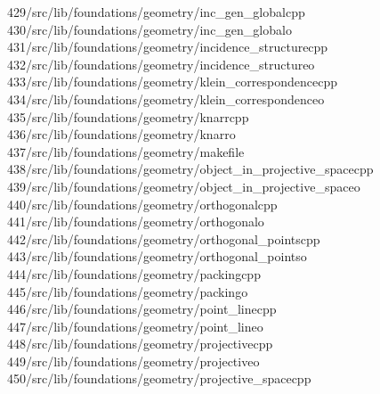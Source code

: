 \begin{tabbing}
429\>/src/lib/foundations/geometry/inc\_gen\_globalcpp\\[0pt]
430\>/src/lib/foundations/geometry/inc\_gen\_globalo\\[0pt]
431\>/src/lib/foundations/geometry/incidence\_structurecpp\\[0pt]
432\>/src/lib/foundations/geometry/incidence\_structureo\\[0pt]
433\>/src/lib/foundations/geometry/klein\_correspondencecpp\\[0pt]
434\>/src/lib/foundations/geometry/klein\_correspondenceo\\[0pt]
435\>/src/lib/foundations/geometry/knarrcpp\\[0pt]
436\>/src/lib/foundations/geometry/knarro\\[0pt]
437\>/src/lib/foundations/geometry/makefile\\[0pt]
438\>/src/lib/foundations/geometry/object\_in\_projective\_spacecpp\\[0pt]
439\>/src/lib/foundations/geometry/object\_in\_projective\_spaceo\\[0pt]
440\>/src/lib/foundations/geometry/orthogonalcpp\\[0pt]
441\>/src/lib/foundations/geometry/orthogonalo\\[0pt]
442\>/src/lib/foundations/geometry/orthogonal\_pointscpp\\[0pt]
443\>/src/lib/foundations/geometry/orthogonal\_pointso\\[0pt]
444\>/src/lib/foundations/geometry/packingcpp\\[0pt]
445\>/src/lib/foundations/geometry/packingo\\[0pt]
446\>/src/lib/foundations/geometry/point\_linecpp\\[0pt]
447\>/src/lib/foundations/geometry/point\_lineo\\[0pt]
448\>/src/lib/foundations/geometry/projectivecpp\\[0pt]
449\>/src/lib/foundations/geometry/projectiveo\\[0pt]
450\>/src/lib/foundations/geometry/projective\_spacecpp\\[0pt]

\end{tabbing}
